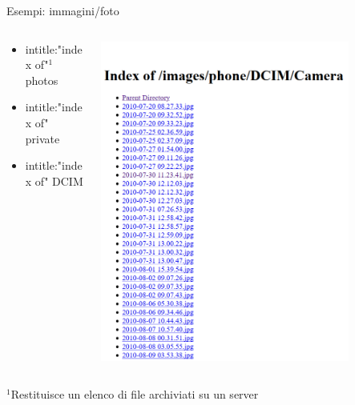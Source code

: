 \documentclass{beamer}
\begin{document}
\begin{frame}{Esempi: immagini/foto}
\begin{columns}
\begin{column}{0.5\textwidth}
\begin{itemize}
\item intitle:"index of"$^1$ photos
\item intitle:"index of" private
\item intitle:"index of" DCIM    
\end{itemize}   
\end{column}
\begin{column}{0.5\textwidth}
\begin{center}
\includegraphics[width=0.8\textwidth]{immagini/immagini.png}
\end{center}
\end{column}
\end{columns}
\medskip
\footnotesize
$^1$Restituisce un elenco di file archiviati su un server
\end{frame}
\end{document}

